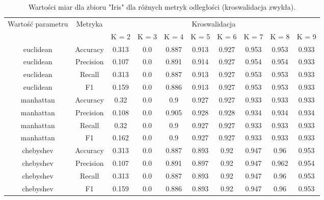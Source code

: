 
\begin{table}[H]
    \begin{tabular}{c|c|cccccccc}
       \multirow{2}{*}{Wartość parametru} & \multirow{2}{*}{Metryka} & \multicolumn{8}{|c|}{Kroswalidacja} \\
         & & K = 2 & K = 3 & K = 4 & K = 5 & K = 6 & K = 7 & K = 8 & K = 9 \\ \hline
         euclidean&Accuracy&0.313& 0.0& 0.887& 0.913& 0.927& 0.953& 0.953& 0.933\\ \hline
euclidean&Precision&0.107& 0.0& 0.891& 0.914& 0.927& 0.954& 0.954& 0.933\\ \hline
euclidean&Recall&0.313& 0.0& 0.887& 0.913& 0.927& 0.953& 0.953& 0.933\\ \hline
euclidean&F1&0.159& 0.0& 0.886& 0.913& 0.927& 0.953& 0.953& 0.933\\ \hline
manhattan&Accuracy&0.32& 0.0& 0.9& 0.927& 0.927& 0.933& 0.933& 0.933\\ \hline
manhattan&Precision&0.108& 0.0& 0.905& 0.928& 0.928& 0.934& 0.934& 0.934\\ \hline
manhattan&Recall&0.32& 0.0& 0.9& 0.927& 0.927& 0.933& 0.933& 0.933\\ \hline
manhattan&F1&0.162& 0.0& 0.9& 0.927& 0.927& 0.933& 0.933& 0.933\\ \hline
chebyshev&Accuracy&0.313& 0.0& 0.887& 0.893& 0.92& 0.947& 0.96& 0.953\\ \hline
chebyshev&Precision&0.107& 0.0& 0.891& 0.897& 0.92& 0.947& 0.962& 0.954\\ \hline
chebyshev&Recall&0.313& 0.0& 0.887& 0.893& 0.92& 0.947& 0.96& 0.953\\ \hline
chebyshev&F1&0.159& 0.0& 0.886& 0.893& 0.92& 0.947& 0.96& 0.953 \\ \hline
    \end{tabular}
    \caption{Wartości miar dla zbioru "Iris" dla różnych metryk odległości (kroswalidacja zwykła).}
\end{table}
    